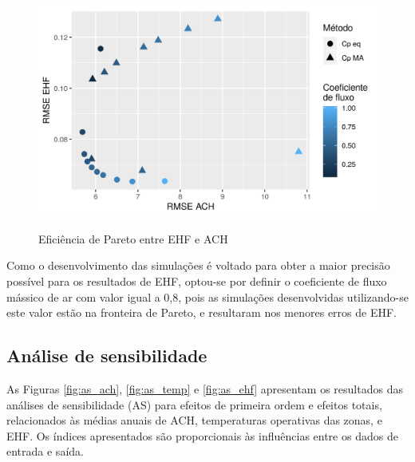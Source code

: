 \documentclass[brazil,hardcopy,openany,a4paper]{ufscthesis}
\begin{document}
	\begin{figure}[H]
		\centering
		\caption{Eficiência de Pareto entre EHF e ACH}
		\includegraphics[width=1\linewidth]{img/cpeq_pareto.png}
		\label{fig:pareto}
	\end{figure}
	
	Como o desenvolvimento das simulações é voltado para obter a maior precisão possível para os resultados de EHF, optou-se por definir o coeficiente de fluxo mássico de ar com valor igual a 0,8, pois as simulações desenvolvidas utilizando-se este valor estão na fronteira de Pareto, e resultaram nos menores erros de EHF.
	
	\subsection{Análise de sensibilidade}
	
	As Figuras \ref{fig:as_ach}, \ref{fig:as_temp} e \ref{fig:as_ehf} apresentam os resultados das análises de sensibilidade (AS) para efeitos de primeira ordem e efeitos totais, relacionados às médias anuais de ACH, temperaturas operativas das zonas, e EHF. Os índices apresentados são proporcionais às influências entre os dados de entrada e saída.
	
\end{document}
